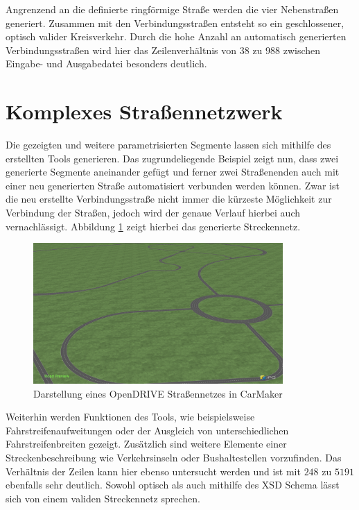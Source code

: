 Angrenzend an die definierte ringförmige Straße werden die vier Nebenstraßen generiert. Zusammen mit den Verbindungsstraßen entsteht so ein geschlossener, optisch valider Kreisverkehr. Durch die hohe Anzahl an automatisch generierten Verbindungsstraßen wird hier das Zeilenverhältnis von \(38\) zu \(988\) zwischen Eingabe- und Ausgabedatei besonders deutlich.

\section{Komplexes Straßennetzwerk}

Die gezeigten und weitere parametrisierten Segmente lassen sich mithilfe des erstellten Tools generieren. Das zugrundeliegende Beispiel zeigt nun, dass zwei generierte Segmente aneinander gefügt und ferner zwei Straßenenden auch mit einer neu generierten Straße automatisiert verbunden werden können. Zwar ist die neu erstellte Verbindungsstraße nicht immer die kürzeste Möglichkeit zur Verbindung der Straßen, jedoch wird der genaue Verlauf hierbei auch vernachlässigt. Abbildung \ref{abb9} zeigt hierbei das generierte Streckennetz.

\begin{figure}[!h]
\flushleft
\center \includegraphics[width=0.85\textwidth]{fig/all.png}
\caption{Darstellung eines OpenDRIVE Straßennetzes in CarMaker}
\label{abb9}
\end{figure}

Weiterhin werden Funktionen des Tools, wie beispielsweise Fahrstreifenaufweitungen oder der Ausgleich von unterschiedlichen Fahrstreifenbreiten gezeigt. Zusätzlich sind weitere Elemente einer Streckenbeschreibung wie Verkehrsinseln oder Bushaltestellen vorzufinden. Das Verhältnis der Zeilen kann hier ebenso untersucht werden und ist mit \(248\) zu \(5191\) ebenfalls sehr deutlich. Sowohl optisch als auch mithilfe des XSD Schema lässt sich von einem validen Streckennetz sprechen.

